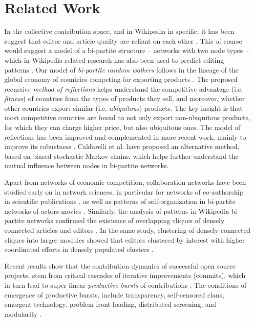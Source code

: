 \section{Related Work}
In the collective contribution space, and in Wikipedia in specific, it has been suggest that editor and article quality are reliant on each other \cite{hu07}. This of course would suggest a model of a bi-partite structure -- networks with two node types -- which in Wikipedia related research has also been used to predict editing patterns \cite{yang14}. Our model of {\it bi-partite random walkers} follows in the lineage of the global economy of countries competing for exporting products \cite{hidalgo2007,hidalgo2009}. The proposed recursive {\it method of reflections} helps understand the competitive advantage (i.e. {\it fitness}) of countries from the types of products they sell, and moreover, whether other countries export similar  (i.e. {\it ubiquitous}) products. The key insight is that most competitive countries are found to not only export non-ubiquitous products, for which they can charge higher price, but also ubiquitous ones. The model of reflections has been improved and complemented in more recent work, mainly to improve its robustness \cite{tacchella2012new, cristelli2012competitors, tacchella2013economic, cristelli2013measuring}. Caldarelli et al. \cite{caldarelli2012network} have proposed an alternative method, based on biased stochastic Markov chains, which helps further understand the mutual influence between nodes in bi-partite networks.

Apart from networks of economic competition, collaboration networks have been studied early on in network sciences, in particular for networks of co-authorship in scientific publications \cite{newman2001}, as well as patterns of self-organization in bi-partite networks of actors-movies \cite{ramasco2004self}. Similarly, the analysis of patterns in Wikipedia bi-partite networks confirmed the existence of overlapping cliques of densely connected articles and editors  \cite{jesus2009}. In the same study, clustering of densely connected cliques into larger modules \cite{guimera2007module} showed that editors clustered by interest with higher coordinated efforts in densely populated clusters \cite{jesus2009}.

Recent results show that the contribution dynamics of successful open source projects, stem from critical cascades of iterative improvements (commits), which in turn lead to super-linear {\it productive bursts} of contributions \cite{sornette2014howmuch}.  The conditions of emergence of productive bursts, include transparency, self-censored clans, emergent technology, problem front-loading, distributed screening, and modularity \cite{vonkrogh2014designing}. 

